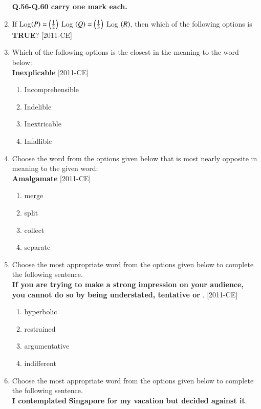 \documentclass[journal]{IEEEtran}
\begin{document}
\begin{enumerate}[start=53]
\textbf{Q.56-Q.60 carry one mark each.}\\
\item If Log$\left(P\right)=\left(\frac{1}{2}\right)$ Log $\left(Q\right)=\left(\frac{1}{3}\right)$ Log $\left(R\right)$, then which of the following options is \textbf{TRUE}? \hfill{[2011-CE]}
\begin{enumerate}
\end{enumerate}

\item Which of the following options is the closest in the meaning to the word below:\\
\textbf{Inexplicable} \hfill{[2011-CE]}\\
\begin{enumerate}
    \item Incomprehensible
    \item Indelible
    \item Inextricable
    \item Infallible
\end{enumerate}
\item Choose the word from the options given below that is most nearly opposite in meaning to the given word:\\
\textbf{Amalgamate} \hfill{[2011-CE]}\\
\begin{enumerate}
    \item merge
    \item split
    \item collect
    \item separate
\end{enumerate}
\item Choose the most appropriate word from the options given below to complete the following sentence.\\
\textbf{If you are trying to make a strong impression on your audience, you cannot do so by being understated, tentative or} \underline{\hspace{1cm}}. \hfill{[2011-CE]}\\
\begin{enumerate}
    \item hyperbolic
    \item restrained
    \item argumentative
    \item indifferent
\end{enumerate}
\item Choose the most appropriate word from the options given below to complete the following sentence.\\
\textbf{I contemplated} \underline{\hspace{1cm}} \textbf{Singapore for my vacation but decided against it}. 


\end{enumerate}
\end{document}
